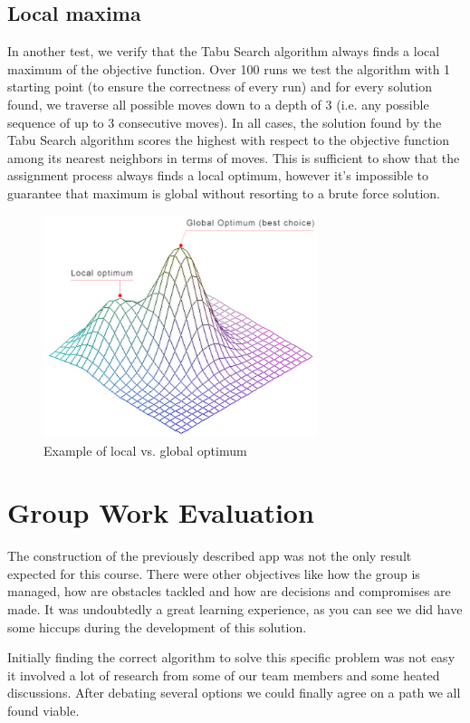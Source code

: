 \subsection{Local maxima}
In another test, we verify that the Tabu Search algorithm always finds a local maximum of the objective function. Over 100 runs we test the algorithm with 1 starting point (to ensure the correctness of every run) and for every solution found, we traverse all possible moves down to a depth of 3 (i.e. any possible sequence of up to 3 consecutive moves). In all cases, the solution found by the Tabu Search algorithm scores the highest with respect to the objective function among its nearest neighbors in terms of moves. This is sufficient to show that the assignment process always finds a local optimum, however it’s impossible to guarantee that maximum is global without resorting to a brute force solution.

\begin{figure}[H]
	\caption{Example of local vs. global optimum}
	\label{fig:local_global_optimum}
	\centering
	\includegraphics[width=8cm]{img/local_global_optimum}
\end{figure}

\section{Group Work Evaluation}
The construction of the previously described app was not the only result expected for this course. There were other objectives like how the group is managed, how are obstacles tackled and how are decisions and compromises are made. It was undoubtedly a great learning experience, as you can see we did have some hiccups during the development of this solution. 

Initially finding the correct algorithm to solve this specific problem was not easy it involved a lot of research from some of our team members and some heated discussions. After debating several options we could finally agree on a path we all found viable.

